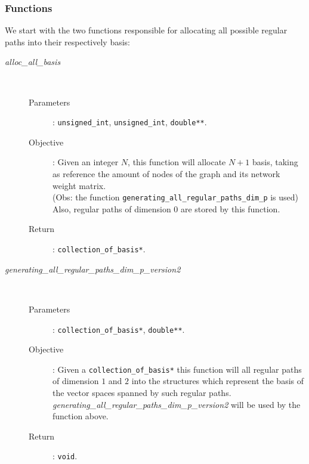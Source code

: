 \documentclass[11pt,a4paper]{article}
\begin{document}
\subsubsection{Functions}
We start with the two functions responsible for allocating all possible 
regular paths into their respectively basis:
\begin{description}
	\item [\textit{alloc\_all\_basis}] \hfill \\[-0.5cm]
		\begin{description}
			\item [Parameters]: \texttt{unsigned\_int}, \texttt{unsigned\_int}, \texttt{double**}.
			\item [Objective]: Given an integer $N$, this function will allocate
				$N+1$ basis, taking as reference the amount of nodes of 
				the graph and its network weight matrix.\\
				(Obs: the function
				\texttt{generating\_all\_regular\_paths\_dim\_p} is used)
				Also, regular paths of dimension 0 are stored by this function.
			\item [Return]: \texttt{collection\_of\_basis*}.
		\end{description}

	\item [\textit{generating\_all\_regular\_paths\_dim\_p\_version2}] \hfill \\[-0.5cm]
		\begin{description}
			\item [Parameters]: \texttt{collection\_of\_basis*}, \texttt{double**}.
			\item [Objective]: Given a \texttt{collection\_of\_basis*} this function
				will all regular paths of dimension $1$ and $2$
				into the structures which represent the basis of the 
				vector spaces spanned by such regular paths.
				\textit{generating\_all\_regular\_paths\_dim\_p\_version2}
				will be used by the function above.
			\item [Return]: \texttt{void}.
		\end{description}
\end{description}
\end{document}
